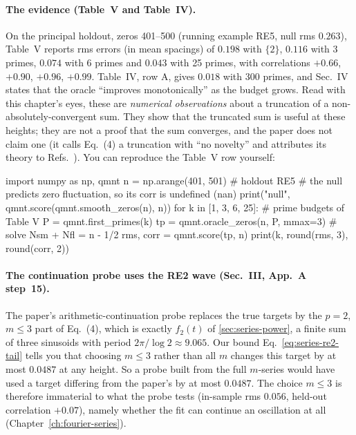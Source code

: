 \paragraph{The evidence (Table~V and Table~IV).} On the principal holdout, zeros 401--500 (running example RE5, null rms $0.263$), Table~V reports rms errors (in mean spacings) of $0.198$ with $\{2\}$, $0.116$ with 3 primes, $0.074$ with 6 primes and $0.043$ with 25 primes, with correlations $+0.66$, $+0.90$, $+0.96$, $+0.99$. Table~IV, row A, gives $0.018$ with 300 primes, and Sec.~IV states that the oracle ``improves monotonically'' as the budget grows. Read with this chapter's eyes, these are \emph{numerical observations} about a truncation of a non-absolutely-convergent sum. They show that the truncated sum is useful at these heights; they are not a proof that the sum converges, and the paper does not claim one (it calls Eq.~(4) a truncation with ``no novelty'' and attributes its theory to Refs.~\cite{francaleclair,leclair}). You can reproduce the Table~V row yourself:

\begin{pycode}
import numpy as np, qmnt
n = np.arange(401, 501)                    # holdout RE5
# the null predicts zero fluctuation, so its corr is undefined (nan)
print("null", qmnt.score(qmnt.smooth_zeros(n), n))
for k in [1, 3, 6, 25]:                    # prime budgets of Table V
    P = qmnt.first_primes(k)
    tp = qmnt.oracle_zeros(n, P, mmax=3)   # solve Nsm + Nfl = n - 1/2
    rms, corr = qmnt.score(tp, n)
    print(k, round(rms, 3), round(corr, 2))
\end{pycode}

\paragraph{The continuation probe uses the RE2 wave (Sec.~III, App.~A step~15).} The paper's arithmetic-continuation probe replaces the true targets by the $p=2$, $m\le3$ part of Eq.~(4), which is exactly $f_2(t)$ of \cref{sec:series-power}, a finite sum of three sinusoids with period $2\pi/\log2\approx9.065$. Our bound Eq.~\eqref{eq:series-re2-tail} tells you that choosing $m\le3$ rather than all $m$ changes this target by at most $0.0487$ at any height. So a probe built from the full $m$-series would have used a target differing from the paper's by at most $0.0487$. The choice $m\le3$ is therefore immaterial to what the probe tests (in-sample rms $0.056$, held-out correlation $+0.07$), namely whether the fit can continue an oscillation at all (Chapter~\ref{ch:fourier-series}).

